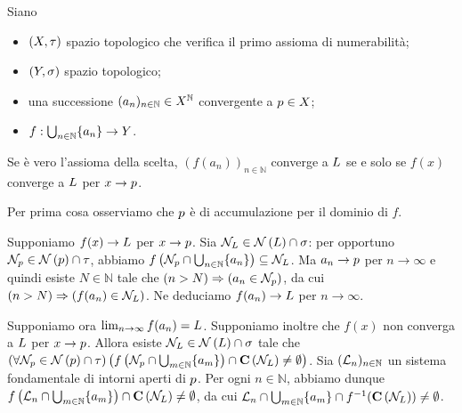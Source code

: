 \begin{Theorem}
	Siano
	\begin{itemize}
		\item $(X,\tau)$ spazio topologico che verifica il primo assioma di numerabilit\`a;
		\item $(Y,\sigma)$ spazio topologico;
		\item una successione $(a_n)_{n \in \mathbb{N}} \in X^\mathbb{N}$ convergente a $p \in X$;
		\item $f: \bigcup_{n \in \mathbb{N}} \lbrace a_n \rbrace \rightarrow Y$.
	\end{itemize}
	Se \`e vero l'assioma della scelta, $(f(a_n))_{n \in \mathbb{N}}$ converge a $L$ se e solo se $f(x)$ converge a $L$ per $x \rightarrow p$.
\end{Theorem}
\Proof Per prima cosa osserviamo che $p$ \`e di accumulazione per il dominio di $f$.
\par Supponiamo $f(x) \rightarrow L$ per $x \rightarrow p$. Sia $\Neighborhood_\Limit \in \Neighborhoods{\Limit} \cap \VarTopology$: per opportuno $\Neighborhood_\AccumulationPoint \in \Neighborhoods{\AccumulationPoint} \cap \Topology$, abbiamo $f \left (\mathcal{N}_p \cap \bigcup_{n \in \mathbb{N}} \lbrace a_n \rbrace \right ) \subseteq \mathcal{N}_L$. Ma $a_n \rightarrow p$ per $n \rightarrow \infty$ e quindi esiste $N \in \mathbb{N}$ tale che $\left ( n > N \right ) \Rightarrow \left ( a_n \in \mathcal{N}_p \right )$, da cui $\left ( n > N \right ) \Rightarrow \left ( f(a_n) \in \mathcal{N}_L \right )$. Ne deduciamo $f(a_n) \rightarrow L$ per $n \rightarrow \infty$.
\par Supponiamo ora $\lim_{n \rightarrow \infty} f(a_n) = L$. Supponiamo inoltre che $f(x)$ non converga a $L$ per $x \rightarrow p$. Allora esiste $\Neighborhood_\Limit \in \Neighborhoods{\Limit} \cap \VarTopology$ tale che $\ForAll{\Neighborhood_\AccumulationPoint \in \Neighborhoods{\AccumulationPoint} \cap \Topology}{f \left ( \Neighborhood_\AccumulationPoint \cap \bigcup_{m \in \mathbb{N}} \lbrace a_m \rbrace \right ) \cap \Compl{\Neighborhood_\Limit} \neq \emptyset}$. Sia $(\mathcal{L}_n)_{n \in \mathbb{N}}$ un sistema fondamentale di intorni aperti di $p$. Per ogni $n \in \mathbb{N}$, abbiamo dunque
$f\left (\mathcal{L}_n \cap \bigcup_{m \in \mathbb{N}} \lbrace a_m \rbrace \right ) \cap \mathbf{C} \left ( \mathcal{N}_L \right ) \neq \emptyset$, da cui $\mathcal{L}_n \cap \bigcup_{m \in \mathbb{N}} \lbrace a_m \rbrace \cap f^{-1}(\mathbf{C} \left ( \mathcal{N}_L \right )) \neq \emptyset$.
